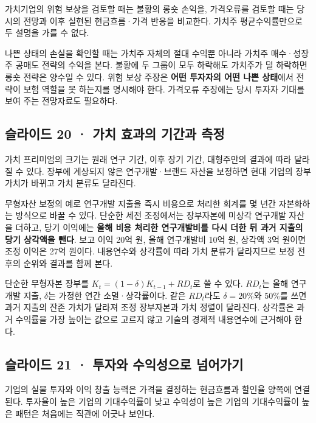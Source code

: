 \documentclass[11pt,a4paper]{article}
\begin{document}
가치기업의 위험 보상을 검토할 때는 불황의 롱숏 손익을, 가격오류를 검토할 때는 당시의 전망과 이후 실현된 현금흐름·가격 반응을 비교한다. 가치주 평균수익률만으로 두 설명을 가를 수 없다.\par

나쁜 상태의 손실을 확인할 때는 가치주 자체의 절대 수익뿐 아니라 가치주 매수·성장주 공매도 전략의 수익을 본다. 불황에 두 그룹이 모두 하락해도 가치주가 덜 하락하면 롱숏 전략은 양수일 수 있다. 위험 보상 주장은 \textbf{어떤 투자자의 어떤 나쁜 상태}에서 전략이 보험 역할을 못 하는지를 명시해야 한다. 가격오류 주장에는 당시 투자자 기대를 보여 주는 전망자료도 필요하다.\par

\subsection{슬라이드 20 · 가치 효과의 기간과 측정}
가치 프리미엄의 크기는 원래 연구 기간, 이후 장기 기간, 대형주만의 결과에 따라 달라질 수 있다. 장부에 계상되지 않은 연구개발·브랜드 자산을 보정하면 현대 기업의 장부가치가 바뀌고 가치 분류도 달라진다.\par

무형자산 보정의 예로 연구개발 지출을 즉시 비용으로 처리한 회계를 몇 년간 자본화하는 방식으로 바꿀 수 있다. 단순한 세전 조정에서는 장부자본에 미상각 연구개발 자산을 더하고, 당기 이익에는 \textbf{올해 비용 처리한 연구개발비를 다시 더한 뒤 과거 지출의 당기 상각액을 뺀다}. 보고 이익 20억 원, 올해 연구개발비 10억 원, 상각액 3억 원이면 조정 이익은 27억 원이다. 내용연수와 상각률에 따라 가치 분류가 달라지므로 보정 전후의 순위와 결과를 함께 본다.\par

단순한 무형자본 장부를 $K_t=(1-\delta)K_{t-1}+RD_t$로 쓸 수 있다. $RD_t$는 올해 연구개발 지출, $\delta$는 가정한 연간 소멸·상각률이다. 같은 $RD_t$라도 $\delta=20\%$와 $50\%$를 쓰면 과거 지출의 잔존 가치가 달라져 조정 장부자본과 가치 정렬이 달라진다. 상각률은 과거 수익률을 가장 높이는 값으로 고르지 않고 기술의 경제적 내용연수에 근거해야 한다.\par

\subsection{슬라이드 21 · 투자와 수익성으로 넘어가기}
기업의 실물 투자와 이익 창출 능력은 가격을 결정하는 현금흐름과 할인율 양쪽에 연결된다. 투자율이 높은 기업의 기대수익률이 낮고 수익성이 높은 기업의 기대수익률이 높은 패턴은 처음에는 직관에 어긋나 보인다.\par
\end{document}
